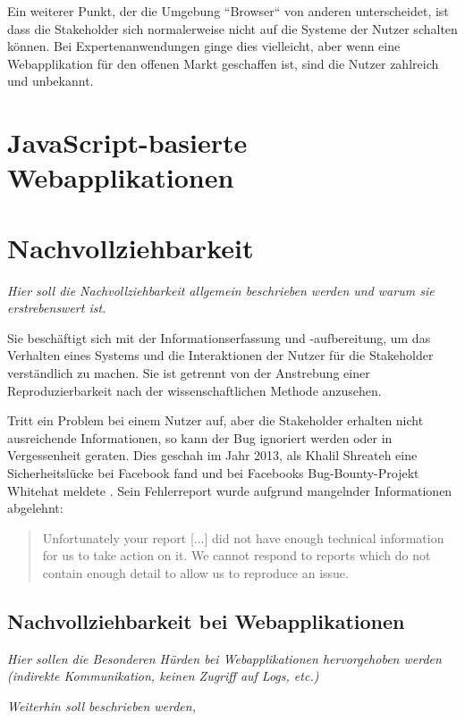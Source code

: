 Ein weiterer Punkt, der die Umgebung ``Browser`` von anderen unterscheidet, ist dass die Stakeholder sich normalerweise nicht auf die Systeme der Nutzer schalten können. Bei Expertenanwendungen ginge dies vielleicht, aber wenn eine Webapplikation für den offenen Markt geschaffen ist, sind die Nutzer zahlreich und unbekannt.

\section{JavaScript-basierte Webapplikationen}

	
\newpage



\newpage

\section{Nachvollziehbarkeit}

	\textit{Hier soll die Nachvollziehbarkeit allgemein beschrieben werden und warum sie erstrebenswert ist.}

	Sie beschäftigt sich mit der Informationserfassung und -aufbereitung, um das Verhalten eines Systems und die Interaktionen der Nutzer für die Stakeholder verständlich zu machen. Sie ist getrennt von der Anstrebung einer Reproduzierbarkeit nach der wissenschaftlichen Methode anzusehen.
	
	{\color{red}\textit{\lipsum[1]}}
	
	Tritt ein Problem bei einem Nutzer auf, aber die Stakeholder erhalten nicht ausreichende Informationen, so kann der Bug ignoriert werden oder in Vergessenheit geraten. Dies geschah im Jahr 2013, als Khalil Shreateh eine Sicherheitslücke bei Facebook fand und bei Facebooks Bug-Bounty-Projekt Whitehat meldete \cite{FacebookBugBounyHunt}. Sein Fehlerreport wurde aufgrund mangelnder Informationen abgelehnt:
	
	\begin{quotation}
	Unfortunately your report [...] did not have enough technical information for us to take action  on  it. We  cannot  respond  to  reports  which  do  not contain enough detail to allow us to reproduce an issue.
	\end{quotation}

\subsection{Nachvollziehbarkeit bei Webapplikationen}

	\textit{Hier sollen die Besonderen Hürden bei Webapplikationen hervorgehoben werden (indirekte Kommunikation, keinen Zugriff auf Logs, etc.)}

	\textit{Weiterhin soll beschrieben werden, }